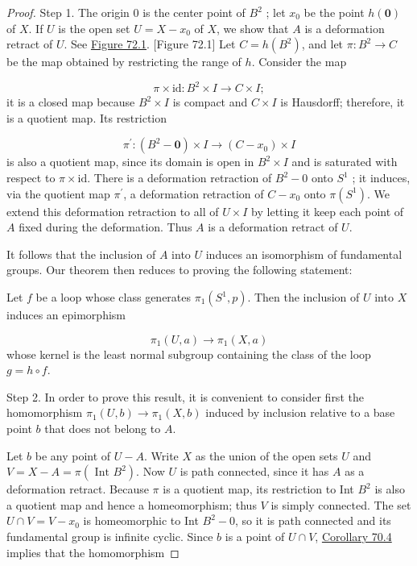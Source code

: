 \begin{proof}
Step 1. The origin 0 is the center point of \(B^{2}\) ; let \(x_{0}\) be the point \(h( \mathbf{0})\) of \(X\). If \(U\) is the open set \(U = X - x_{0}\) of \(X\), we show that \(A\) is a deformation retract of \(U\). See \hyperref[fig:72.1]{Figure 72.1}.
[Figure 72.1]
Let \(C = h( B^{2})\), and let \(\pi : B^{2} \rightarrow C\) be the map obtained by restricting the range of \(h\). Consider the map

\[
\pi \times \mathrm{{id}} : B^{2} \times I \rightarrow C \times I;
\]
it is a closed map because \(B^{2} \times I\) is compact and \(C \times I\) is Hausdorff; therefore, it is a quotient map. Its restriction

\[
{\pi }^{\prime } : ( {B^{2} - \mathbf{0}}) \times I \rightarrow ( {C - x_{0}}) \times I
\]
is also a quotient map, since its domain is open in \(B^{2} \times I\) and is saturated with respect to \(\pi \times \mathrm{{id}}\). There is a deformation retraction of \(B^{2} - 0\) onto \(S^{1}\) ; it induces, via the quotient map \({\pi }^{\prime }\), a deformation retraction of \(C - x_{0}\) onto \(\pi ( S^{1})\). We extend this deformation retraction to all of \(U \times I\) by letting it keep each point of \(A\) fixed during the deformation. Thus \(A\) is a deformation retract of \(U\).

It follows that the inclusion of \(A\) into \(U\) induces an isomorphism of fundamental groups. Our theorem then reduces to proving the following statement:

Let \(f\) be a loop whose class generates \({\pi }_{1}( {S^{1},p})\). Then the inclusion of \(U\) into \(X\) induces an epimorphism

\[
{\pi }_{1}( {U,a}) \rightarrow {\pi }_{1}( {X,a})
\]
whose kernel is the least normal subgroup containing the class of the loop \(g = h \circ f\).

Step 2. In order to prove this result, it is convenient to consider first the homomorphism \({\pi }_{1}( {U,b}) \rightarrow {\pi }_{1}( {X,b})\) induced by inclusion relative to a base point \(b\) that does not belong to \(A\).

Let \(b\) be any point of \(U - A\). Write \(X\) as the union of the open sets \(U\) and \(V = X - A = \pi ( {\text{ Int }B^{2}})\). Now \(U\) is path connected, since it has \(A\) as a deformation retract. Because \(\pi\) is a quotient map, its restriction to Int \(B^{2}\) is also a quotient map and hence a homeomorphism; thus \(V\) is simply connected. The set \(U \cap V = V - x_{0}\) is homeomorphic to Int \(B^{2} - 0\), so it is path connected and its fundamental group is infinite cyclic. Since \(b\) is a point of \(U \cap V\), \hyperref[cor:70.4]{Corollary 70.4} implies that the homomorphism


\end{proof}
